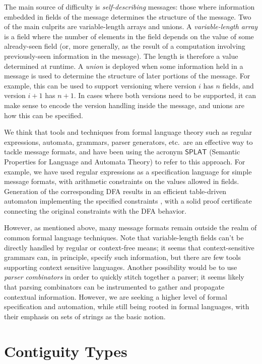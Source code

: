 \documentclass[svgnames]{llncs}
\newcommand{\etc}{etc.}
\newcommand{\konst}[1]{\ensuremath{\mathsf{#1}}}
\begin{document}
The main source of difficulty is \emph{self-describing} messages:
those where information embedded in fields of the message determines
the structure of the message. Two of the main culprits are
variable-length arrays and unions. A \emph{variable-length array} is a
field where the number of elements in the field depends on the value
of some already-seen field (or, more generally, as the result of a
computation involving previously-seen information in the message).
The length is therefore a value determined at runtime. A \emph{union}
is deployed when some information held in a message is used to
determine the structure of later portions of the message. For example,
this can be used to support versioning where version $i$ has $n$
fields, and version $i+1$ has $n+1$. In cases where both versions need
to be supported, it can make sense to encode the version handling
inside the message, and unions are how this can be specified.

We think that tools and techniques from formal language theory such as
regular expressions, automata, grammars, parser generators, \etc\, are
an effective way to tackle message formats, and have been using the
acronym \konst{SPLAT} (Semantic Properties for Language and Automata
Theory) to refer to this approach. For example, we have used regular
expressions as a specification language for simple message formats,
with arithmetic constraints on the values allowed in
fields. Generation of the corresponding DFA results in an efficient
table-driven automaton implementing the specified constraints \cite{},
with a solid proof certificate connecting the original constraints
with the DFA behavior.

However, as mentioned above, many message formats remain outside the
realm of common formal language techniques.  Note that variable-length
fields can't be directly handled by regular or context-free means; it
seems that context-sensitive grammars can, in principle, specify such
information, but there are few tools supporting context sensitive
languages. Another possibility would be to use \emph{parser
  combinators} in order to quickly stitch together a parser; it seems
likely that parsing combinators can be instrumented to gather and
propagate contextual information. However, we are seeking a higher
level of formal specification and automation, while still being rooted
in formal languages, with their emphasis on sets of strings as the
basic notion.

\section {Contiguity Types}
\end{document}
